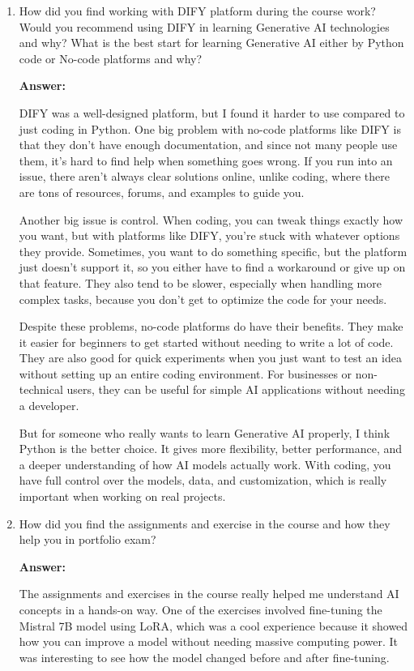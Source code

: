\begin{enumerate}
     \item  How did you find working with DIFY platform during the course work? Would you recommend using DIFY in learning Generative AI technologies and why? What is the best start for learning Generative AI either by Python code or No-code platforms and why? 
    
     \textbf{Answer: }


     DIFY was a well-designed platform, but I found it harder to use compared to just coding in Python. One big problem with no-code platforms like DIFY is that they don’t have enough documentation, and since not many people use them, it’s hard to find help when something goes wrong. If you run into an issue, there aren’t always clear solutions online, unlike coding, where there are tons of resources, forums, and examples to guide you.

     Another big issue is control. When coding, you can tweak things exactly how you want, but with platforms like DIFY, you're stuck with whatever options they provide. Sometimes, you want to do something specific, but the platform just doesn’t support it, so you either have to find a workaround or give up on that feature. They also tend to be slower, especially when handling more complex tasks, because you don’t get to optimize the code for your needs.
     
     Despite these problems, no-code platforms do have their benefits. They make it easier for beginners to get started without needing to write a lot of code. They are also good for quick experiments when you just want to test an idea without setting up an entire coding environment. For businesses or non-technical users, they can be useful for simple AI applications without needing a developer.
     
     But for someone who really wants to learn Generative AI properly, I think Python is the better choice. It gives more flexibility, better performance, and a deeper understanding of how AI models actually work. With coding, you have full control over the models, data, and customization, which is really important when working on real projects.


     \item How did you find the assignments and exercise in the course and how they help you in portfolio exam? 
    
     \textbf{Answer: }


The assignments and exercises in the course really helped me understand AI concepts in a hands-on way. One of the exercises involved fine-tuning the Mistral 7B model using LoRA, which was a cool experience because it showed how you can improve a model without needing massive computing power. It was interesting to see how the model changed before and after fine-tuning.


\end{enumerate}
